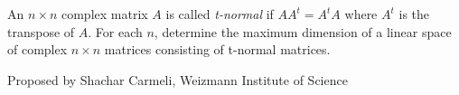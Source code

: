An $n \times n$ complex matrix $A$ is called \emph{t-normal} if
$AA^t = A^t A$ where $A^t$ is the transpose of $A$.  For each $n$,
determine the maximum dimension of a linear space of complex $n
\times n$ matrices consisting of t-normal matrices.

Proposed by Shachar Carmeli, Weizmann Institute of Science